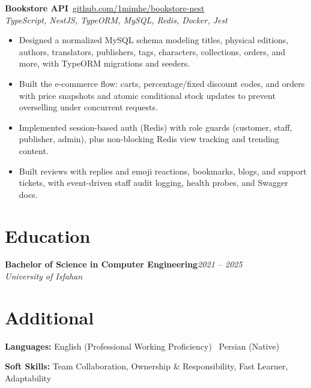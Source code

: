 \documentclass[a4paper,10pt]{article}
\newcommand{\projectheader}[4]{%
  \noindent\textbf{#1}\hfill{\small\faGithub\ \href{#2}{#3}}\\[-2pt]
  {\small\color{medgray}\textit{#4}}
  \vspace{2pt}
}
\newcommand{\skillcategory}[2]{%
  \noindent\textbf{#1:} #2\par\vspace{2.5pt}%
}
\begin{document}
\vspace{4pt}

\projectheader
  {Bookstore API}
  {https://github.com/1mimhe/bookstore-nest}
  {github.com/1mimhe/bookstore-nest}
  {TypeScript, NestJS, TypeORM, MySQL, Redis, Docker, Jest}

\begin{itemize}
  \item Designed a normalized MySQL schema modeling titles, physical editions, authors, translators, publishers, tags, characters, collections, orders, and more, with TypeORM migrations and seeders.
  \item Built the e-commerce flow: carts, percentage/fixed discount codes, and orders with price snapshots and atomic conditional stock updates to prevent overselling under concurrent requests.
  \item Implemented session-based auth (Redis) with role guards (customer, staff, publisher, admin), plus non-blocking Redis view tracking and trending content.
  \item Built reviews with replies and emoji reactions, bookmarks, blogs, and support tickets, with event-driven staff audit logging, health probes, and Swagger docs.
\end{itemize}

\section{Education}

\noindent\textbf{Bachelor of Science in Computer Engineering}\hfill\textit{\small\color{medgray}2021 -- 2025}\\
\textit{\color{medgray}University of Isfahan}

\section{Additional}

\skillcategory{Languages}{English (Professional Working Proficiency) \textbar\ Persian (Native)}

\skillcategory{Soft Skills}{Team Collaboration, Ownership \& Responsibility, Fast Learner, Adaptability}
\end{document}
